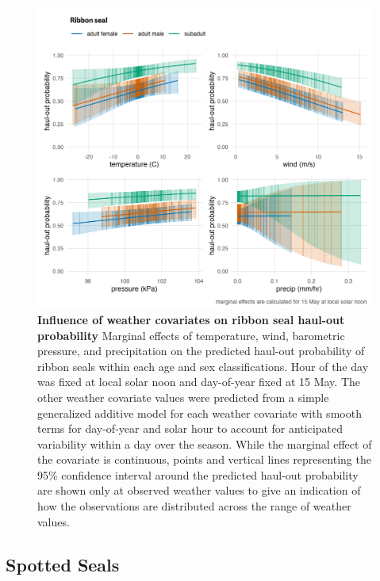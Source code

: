 \documentclass[fleqn,10pt,lineno]{wlpeerj} %
\begin{document}
\begin{figure}
\includegraphics[width=1\linewidth]{../figures/Figure-008} \caption{\textbf{Influence of weather covariates on ribbon seal haul-out probability} \linebreak Marginal effects of temperature, wind, barometric pressure, and precipitation on the predicted haul-out probability of ribbon seals within each age and sex classifications. Hour of the day was fixed at local solar noon and day-of-year fixed at 15 May. The other weather covariate values were predicted from a simple generalized additive model for each weather covariate with smooth terms for day-of-year and solar hour to account for anticipated variability within a day over the season. While the marginal effect of the covariate is continuous, points and vertical lines representing the 95\% confidence interval around the predicted haul-out probability are shown only at observed weather values to give an indication of how the observations are distributed across the range of weather values.}\label{fig:ribbonHOwx}
\end{figure}

\subsection*{Spotted Seals}\label{spotted-seals}
\end{document}
